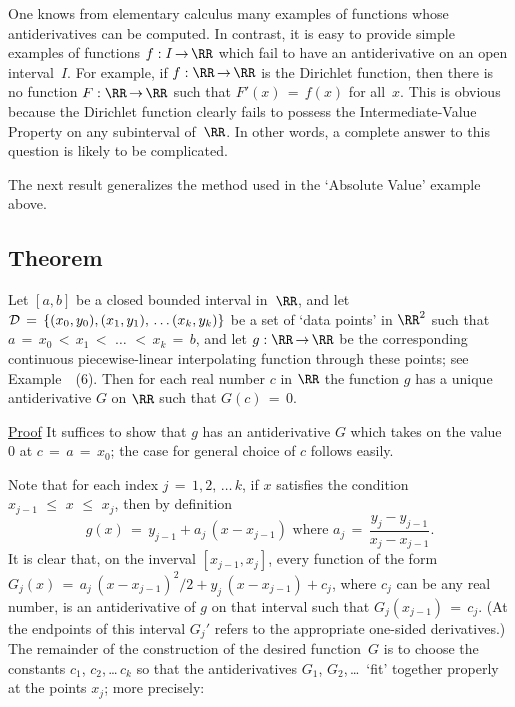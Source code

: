 \VA

\noindent One knows from elementary calculus many examples of functions whose antiderivatives can be computed.
    In contrast, it is easy to provide simple examples of functions $f:I \,{\rightarrow}\, {\RR}$
    which fail to have an antiderivative on an open interval~$I$. For example, if $f:{\RR} \,{\rightarrow}\, {\RR}$ is the Dirichlet function,
    then there is no function $F:{\RR} \,{\rightarrow}\, {\RR}$ such that $F'(x) \,=\, f(x)$ for all~$x$.
    This is obvious because the Dirichlet function clearly fails to possess the Intermediate-Value Property on any subinterval of~${\RR}$.
    In other words, a complete answer to this question is likely to be complicated.

\V

        The next result generalizes the method used in the `Absolute Value' example above.

\V

             \subsection{\small{\bf Theorem}}
            \label{ThmE45.125A}

\V

        Let $[a,b]$ be a closed bounded interval in~${\RR}$, and let ${\cal D} \,=\, \{(x_{0},y_{0}), (x_{1},y_{1}),\,{\ldots}\,(x_{k},y_{k})\}$
    be a set of `data points' in ${\RR}^{2}$ such that $a \,=\, x_{0}\,<\,x_{1}\,<\,\,{\ldots}\,\,<\,x_{k} \,=\, b$,
    and let $g:{\RR} \,{\rightarrow}\, {\RR}$ be the corresponding continuous piecewise-linear interpolating function through these points;
    see Example~~(6). Then for each real number $c$ in ${\RR}$ the function $g$ has a unique antiderivative $G$ on ${\RR}$ such that $G(c) \,=\, 0$.

\V

        \underline{Proof} It suffices to show that $g$ has an antiderivative $G$ which takes on the value $0$ at $c \,=\, a \,=\, x_{0}$; the case for general choice of $c$ follows easily.

        Note that for each index $j \,=\, 1,2,\,{\ldots}\,k$, if $x$ satisfies the condition $x_{j-1}\,\,{\leq}\,\,x\,\,{\leq}\,\,x_{j}$, then by definition
        \begin{displaymath}
        g(x) \,=\, y_{j-1} + a_{j}\,(x-x_{j-1}) \mbox{ where } a_{j} \,=\, \frac{y_{j} - y_{j-1}}{x_{j} - x_{j-1}}.
        \end{displaymath}
    It is clear that, on the inverval $[x_{j-1},x_{j}]$, every function of the form $G_{j}(x) \,=\, a_{j}\,(x-x_{j-1})^{2}/2 + y_{j}\,(x-x_{j-1}) + c_{j}$, where $c_{j}$ can be any real number,
    is an antiderivative of $g$ on that interval such that $G_{j}(x_{j-1}) \,=\, c_{j}$. (At the endpoints of this interval $G_{j}'$ refers to the appropriate one-sided derivatives.)
    The remainder of the construction of the desired function~$G$ is to choose the constants
    $c_{1}$, $c_{2}$,\,{\ldots}\,$c_{k}$ so that the antiderivatives $G_{1}$, $G_{2}$,\,{\ldots}\, `fit' together properly at the points $x_{j}$; more precisely:

